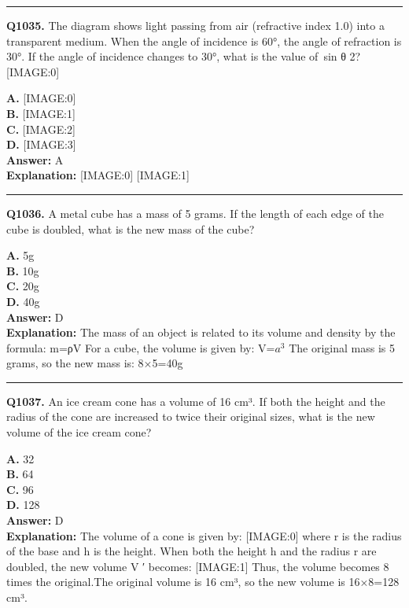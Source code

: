 \documentclass[12pt]{article}
\begin{document}
\hrule
\vspace{1em}


\noindent
\textbf{Q1035.} The diagram shows light passing from air (refractive index 1.0) into a transparent medium. When the angle of incidence is 60°, the angle of refraction is 30°. If the angle of incidence changes to 30°, what is the value of sin
θ
2?
[IMAGE:0]



\textbf{A.} [IMAGE:0] \\
\textbf{B.} [IMAGE:1] \\
\textbf{C.} [IMAGE:2] \\
\textbf{D.} [IMAGE:3] \\

\textbf{Answer:} A \\
\textbf{Explanation:} [IMAGE:0]
[IMAGE:1]

\hrule
\vspace{1em}


\noindent
\textbf{Q1036.} A metal cube has a mass of 5 grams. If the length of each edge of the cube is doubled, what is the new mass of the cube?



\textbf{A.} 5g \\
\textbf{B.} 10g \\
\textbf{C.} 20g \\
\textbf{D.} 40g \\

\textbf{Answer:} D \\
\textbf{Explanation:} The mass of an object is related to its volume and density by the formula: m=ρV
For a cube, the volume is given by: V=$a^3$ The original mass is 5 grams, so the new mass is: 8×5=40g

\hrule
\vspace{1em}


\noindent
\textbf{Q1037.} An ice cream cone has a volume of 16 cm³. If both the height and the radius of the cone are increased to twice their original sizes, what is the new volume of the ice cream cone?



\textbf{A.} 32 \\
\textbf{B.} 64 \\
\textbf{C.} 96 \\
\textbf{D.} 128 \\

\textbf{Answer:} D \\
\textbf{Explanation:} The volume of a cone is given by:
[IMAGE:0]
where
r
is the radius of the base and
h
is the height.
When both the height
h
and the radius
r
are doubled, the new volume
V
′ becomes:
[IMAGE:1]
Thus, the volume becomes 8 times the original.The original volume is 16 cm³, so the new volume is 16×8=128 cm³.
\end{document}

